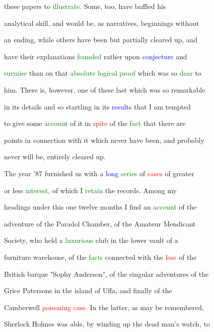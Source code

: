  these papers to \textcolor{green}{illustrate.} Some, too, have baffled his

 analytical skill, and would be, as narratives, beginnings without

 an ending, while others have been but partially cleared up, and

 have their explanations \textcolor{green}{founded} rather upon \textcolor{blue}{conjecture} and

 \textcolor{green}{surmise} than on that \textcolor{green}{absolute} \textcolor{green}{logical} \textcolor{green}{proof} which was so \textcolor{green}{dear} to

 him. There is, however, one of these last which was so \textcolor{BurntOrange}{remarkable}

 in its details and so \textcolor{BurntOrange}{startling} in its \textcolor{blue}{results} that I am tempted

 to give some \textcolor{green}{account} of it in \textcolor{red}{spite} of the \textcolor{green}{fact} that there are

 points in connection with it which never have been, and probably

 never will be, entirely cleared up.



 The year '87 furnished us with a \textcolor{blue}{long} \textcolor{green}{series} of \textcolor{red}{cases} of greater

 or less \textcolor{green}{interest,} of which I \textcolor{green}{retain} the records. Among my

 headings under this one twelve months I find an \textcolor{green}{account} of the

 \textcolor{BurntOrange}{adventure} of the Paradol Chamber, of the Amateur Mendicant

 Society, who held a \textcolor{green}{luxurious} club in the lower vault of a

 furniture warehouse, of the \textcolor{green}{facts} connected with the \textcolor{red}{loss} of the

 British barque "Sophy Anderson", of the singular \textcolor{BurntOrange}{adventures} of the

 Grice Patersons in the island of Uffa, and \textcolor{BurntOrange}{finally} of the

 Camberwell \textcolor{red}{poisoning} \textcolor{red}{case.} In the latter, as may be remembered,

 Sherlock Holmes was able, by winding up the dead man's \textcolor{BurntOrange}{watch,} to

